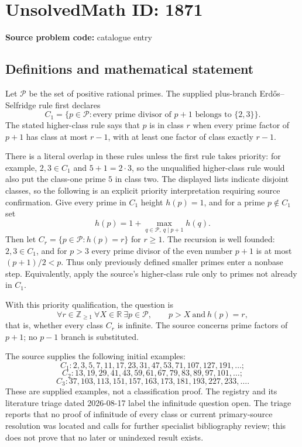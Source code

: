 \documentclass[11pt]{article}
\newcommand{\Z}{\mathbb{Z}}
\newcommand{\R}{\mathbb{R}}
\begin{document}
\section*{UnsolvedMath ID: 1871}
\textbf{Source problem code:} catalogue entry
\subsection{Definitions and mathematical statement}
Let $\mathcal P$ be the set of positive rational primes. The supplied plus-branch Erd\H{o}s--Selfridge rule first declares
\[
C_1=\{p\in\mathcal P:\text{every prime divisor of }p+1\text{ belongs to }\{2,3\}\}.
\]
The stated higher-class rule says that $p$ is in class $r$ when every prime factor of $p+1$ has class at most $r-1$, with at least one factor of class exactly $r-1$.

There is a literal overlap in these rules unless the first rule takes priority: for example, $2,3\in C_1$ and $5+1=2\cdot3$, so the unqualified higher-class rule would also put the class-one prime $5$ in class two. The displayed lists indicate disjoint classes, so the following is an explicit priority interpretation requiring source confirmation. Give every prime in $C_1$ height $h(p)=1$, and for a prime $p\notin C_1$ set
\[
h(p)=1+\max_{q\in\mathcal P,\ q\mid p+1}h(q).
\]
Then let $C_r=\{p\in\mathcal P:h(p)=r\}$ for $r\geq1$. The recursion is well founded: $2,3\in C_1$, and for $p>3$ every prime divisor of the even number $p+1$ is at most $(p+1)/2<p$. Thus only previously defined smaller primes enter a nonbase step. Equivalently, apply the source's higher-class rule only to primes not already in $C_1$.

With this priority qualification, the question is
\[
\forall r\in\Z_{\geq1}\ \forall X\in\R\ \exists p\in\mathcal P,\qquad p>X\ \text{and}\ h(p)=r,
\]
that is, whether every class $C_r$ is infinite. The source concerns prime factors of $p+1$; no $p-1$ branch is substituted.

The source supplies the following initial examples:
\[
C_1: 2,3,5,7,11,17,23,31,47,53,71,107,127,191,\ldots;
\]
\[
C_2: 13,19,29,41,43,59,61,67,79,83,89,97,101,\ldots;
\]
\[
C_3: 37,103,113,151,157,163,173,181,193,227,233,\ldots.
\]
These are supplied examples, not a classification proof. The registry and its literature triage dated 2026-08-17 label the infinitude question open. The triage reports that no proof of infinitude of every class or current primary-source resolution was located and calls for further specialist bibliography review; this does not prove that no later or unindexed result exists.
\end{document}
